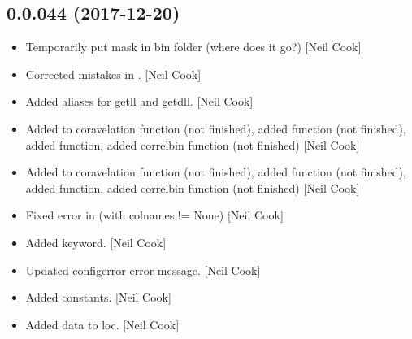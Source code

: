 \documentclass[a4paper,10pt,english]{report}
\begin{document}
\subsection{0.0.044 (2017-12-20)}
\label{\detokenize{misc/changelog:id508}}\begin{itemize}
\item {} 
Temporarily put mask in bin folder (where does it go?) {[}Neil Cook{]}

\item {} 
Corrected mistakes in . {[}Neil Cook{]}

\item {} 
Added aliases for getll and getdll. {[}Neil Cook{]}

\item {} 
Added to coravelation function (not finished), added 
function (not finished), added  function, added correlbin
function (not finished) {[}Neil Cook{]}

\item {} 
Added to coravelation function (not finished), added 
function (not finished), added  function, added correlbin
function (not finished) {[}Neil Cook{]}

\item {} 
Fixed error in  (with colnames != None) {[}Neil Cook{]}

\item {} 
Added keyword. {[}Neil Cook{]}

\item {} 
Updated configerror error message. {[}Neil Cook{]}

\item {} 
Added constants. {[}Neil Cook{]}

\item {} 
Added data to loc. {[}Neil Cook{]}

\end{itemize}
\end{document}
